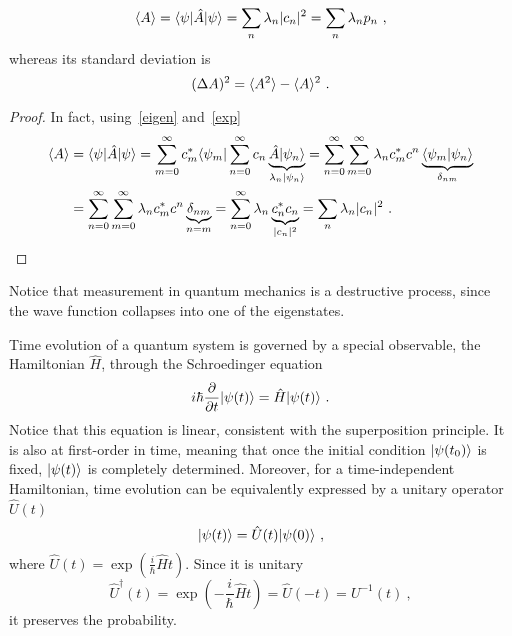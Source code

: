     \begin{equation}\label{avval}
        \langle A\rangle = \langle\psi\vert \hat A \vert\psi\rangle = \sum_{n} \lambda_n |c_n|^2 = \sum_{n} \lambda_n p_n ~,
    \end{equation}
    whereas its standard deviation is 
    \begin{equation*}
        (\Delta A)^2 = \langle A^2\rangle - \langle A\rangle^2 ~.
    \end{equation*}
    \begin{proof}
        In fact, using~\eqref{eigen} and~\eqref{exp}
        \begin{equation*}
        \begin{aligned}
            \langle A\rangle & = \langle\psi\vert \hat A \vert\psi\rangle = \sum_{m=0}^{\infty} c_m^* \langle\psi_m\vert \sum_{n=0}^{\infty} c_n \underbrace{\hat A \vert\psi_n\rangle}_{\lambda_n \vert\psi_n\rangle} = \sum_{n=0}^{\infty} \sum_{m=0}^{\infty} \lambda_n c^*_m c^n \underbrace{\langle\psi_m\vert\psi_n\rangle}_{\delta_{nm}} \\ & = \sum_{n=0}^{\infty} \sum_{m=0}^{\infty} \lambda_n c^*_m c^n \underbrace{\delta_{nm}}_{n=m} = \sum_{n=0}^{\infty} \lambda_n \underbrace{c^*_n c_n}_{|c_n|^2} = \sum_{n} \lambda_n |c_n|^2 ~.
        \end{aligned}
        \end{equation*}
    \end{proof}
    Notice that measurement in quantum mechanics is a destructive process, since the wave function collapses into one of the eigenstates. 

    Time evolution of a quantum system is governed by a special observable, the Hamiltonian $\hat H$, through the Schroedinger equation
    \begin{equation*}
        i \hbar \frac{\partial}{\partial t} \vert\psi(t)\rangle = \hat H \vert\psi(t)\rangle ~.
    \end{equation*}
    Notice that this equation is linear, consistent with the superposition principle. It is also at first-order in time, meaning that once the initial condition $\vert\psi(t_0)\rangle$ is fixed, $\vert\psi(t)\rangle$ is completely determined.
    Moreover, for a time-independent Hamiltonian, time evolution can be equivalently expressed by a unitary operator $\hat U(t)$  
    \begin{equation}\label{tev}
        \vert\psi(t)\rangle = \hat U(t) \vert\psi(0)\rangle ~,
    \end{equation}
    where $\hat U(t) = \exp (\frac{i}{\hbar} \hat H t)$. Since it is unitary 
    \begin{equation*}
        \hat U^\dagger (t) = \exp(- \frac{i}{\hbar} \hat H t) = \hat U(-t) = U^{-1} (t) ~,
    \end{equation*}
    it preserves the probability.

